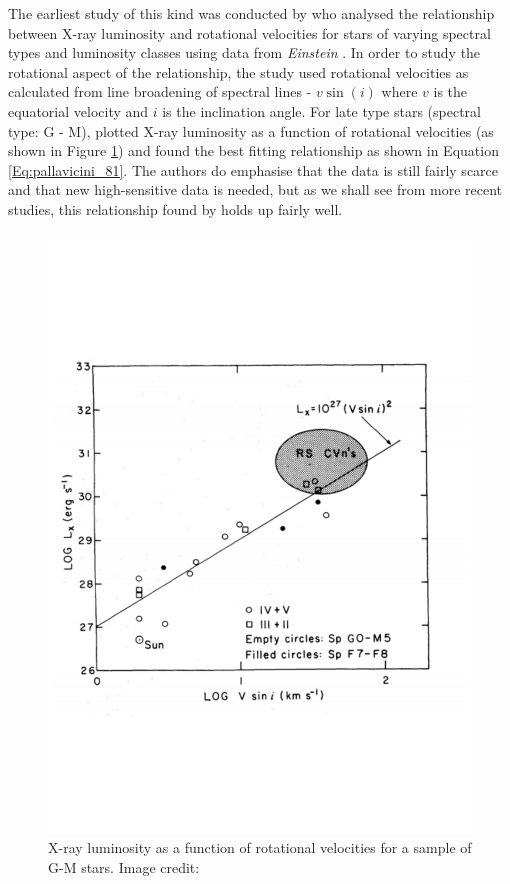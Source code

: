 The earliest study of this kind was conducted by \citet{Pallavicini_etal_1981} who analysed the relationship between X-ray luminosity and rotational velocities for stars of varying spectral types and luminosity classes using data from \textit{Einstein} \citep{Giacconi_etal_1979}. In order to study the rotational aspect of the relationship, the study used rotational velocities as calculated from line broadening of spectral lines - $v\sin(i)$ where $v$ is the equatorial velocity and $i$ is the inclination angle. For late type stars (spectral type: G - M), \citet{Pallavicini_etal_1981} plotted X-ray luminosity as a function of rotational velocities (as shown in Figure \ref{fig:pallavicini_etal_1981_plot}) and found the best fitting relationship as shown in Equation \ref{Eq:pallavicini_81}. The authors do emphasise that the data is still fairly scarce and that new high-sensitive data is needed, but as we shall see from more recent studies, this relationship found by \citet{Pallavicini_etal_1981} holds up fairly well.

\begin{figure}
    \centering
    \includegraphics[scale=0.5]{Figures/2-Historical_overview/p81_fig_5.pdf}
    \caption[First plot of magnetic activity as a function of rotational velocity]{X-ray luminosity as a function of rotational velocities for a sample of G-M stars. Image credit: \citet{Pallavicini_etal_1981}}
    \label{fig:pallavicini_etal_1981_plot}
\end{figure}

